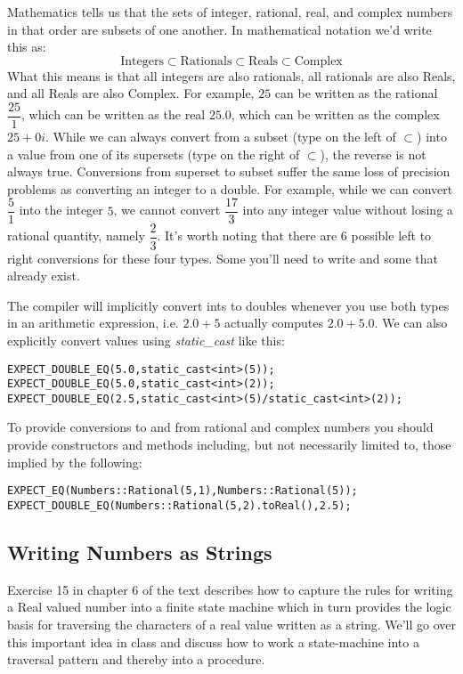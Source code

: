 \documentclass[10pt]{article}
\begin{document}
Mathematics tells us that the sets of integer, rational, real, and complex numbers in that order are subsets of one another. In mathematical notation we'd write this as: 
\begin{equation}
\mbox{Integers} \subset \mbox{Rationals} \subset \mbox{Reals} \subset \mbox{Complex}
\end{equation}
What this means is that all integers are also rationals, all rationals are also Reals, and all Reals are also Complex. For example, $25$ can be written as the rational $\dfrac{25}{1}$, which can be written as the real $25.0$, which can be written as the complex $25+0i$. While we can always convert from a subset (type on the left of $\subset$) into a value from one of its supersets (type on the right of $\subset$), the reverse is not always true.  Conversions from superset to subset suffer the same loss of precision problems as converting an integer to a double.  For example, while we can convert $\dfrac{5}{1}$ into the integer $5$, we cannot convert $\dfrac{17}{3}$ into any integer value without losing a rational quantity, namely $\dfrac{2}{3}$. It's worth noting that there are 6 possible left to right conversions for these four types. Some you'll need to write and some that already exist.

The compiler will implicitly convert ints to doubles whenever you use both types in an arithmetic expression, i.e. $2.0 + 5$ actually computes $2.0 + 5.0$. We can also explicitly convert values using \textit{static\_cast} like this:
\begin{verbatim}
EXPECT_DOUBLE_EQ(5.0,static_cast<int>(5));	
EXPECT_DOUBLE_EQ(5.0,static_cast<int>(2));
EXPECT_DOUBLE_EQ(2.5,static_cast<int>(5)/static_cast<int>(2));
\end{verbatim}
To provide conversions to and from rational and complex numbers you should provide constructors and methods including, but not necessarily limited to, those implied by the following:
\begin{verbatim}
EXPECT_EQ(Numbers::Rational(5,1),Numbers::Rational(5));
EXPECT_DOUBLE_EQ(Numbers::Rational(5,2).toReal(),2.5);
\end{verbatim}

\subsection{Writing Numbers as Strings}

Exercise 15 in chapter 6 of the text describes how to capture the rules for writing a Real valued number into a finite state machine which in turn provides the logic basis for traversing the characters of a real value written as a string. We'll go over this important idea in class and discuss how to work a state-machine into a traversal pattern and thereby into a procedure. 
\end{document}
